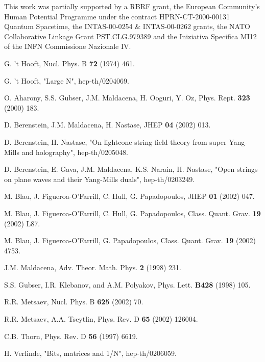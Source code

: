 \documentclass[a4paper]{article}
\begin{document}
This work was partially supported by a RBRF grant, the European
Community's Human Potential Programme under the contract
HPRN-CT-2000-00131 Quantum Spacetime, the INTAS-00-0254 \&
INTAS-00-0262 grants, the NATO Collaborative Linkage Grant
PST.CLG.979389 and the Iniziativa Specifica MI12 of the INFN
Commissione Nazionale IV.



\begin{thebibliography}{99}

G. 't Hooft, Nucl. Phys. B {\bf 72} (1974) 461.

 G. 't Hooft, "Large N", hep-th/0204069.

O. Aharony, S.S. Gubser, J.M. Maldacena, H. Ooguri, Y. Oz,
Phys. Rept. {\bf 323} (2000) 183.

D. Berenstein, J.M. Maldacena, H. Nastase,
JHEP {\bf 04} (2002) 013.

D. Berenstein, H. Nastase, "On lightcone string field theory from super Yang-Mills and
holography", hep-th/0205048.

D. Berenstein, E. Gava, J.M. Maldacena, K.S. Narain, H. Nastase,
"Open strings on plane waves and their {Yang-Mills} duals", hep-th/0203249.

M. Blau, J. Figueroa-O'Farrill, C. Hull, G. Papadopoulos,
JHEP {\bf 01} (2002) 047.

M. Blau, J. Figueroa-O'Farrill, C. Hull, G. Papadopoulos,
Class. Quant. Grav. {\bf 19} (2002) L87.

M. Blau, J. Figueroa-O'Farrill, G. Papadopoulos,
Class. Quant. Grav. {\bf 19} (2002) 4753.

J.M. Maldacena, Adv. Theor. Math. Phys. {\bf 2} (1998) 231.

S.S. Gubser, I.R. Klebanov, and A.M. Polyakov, Phys. Lett. {\bf B428} (1998)
  105.

 R.R. Metsaev, Nucl. Phys. B {\bf 625} (2002) 70.

R.R. Metsaev, A.A. Tseytlin, Phys. Rev. D {\bf 65} (2002) 126004.

 C.B. Thorn, Phys. Rev. D {\bf 56} (1997) 6619.

 H. Verlinde, "Bits, matrices and {1/N}", hep-th/0206059.


\end{thebibliography}
\end{document}
